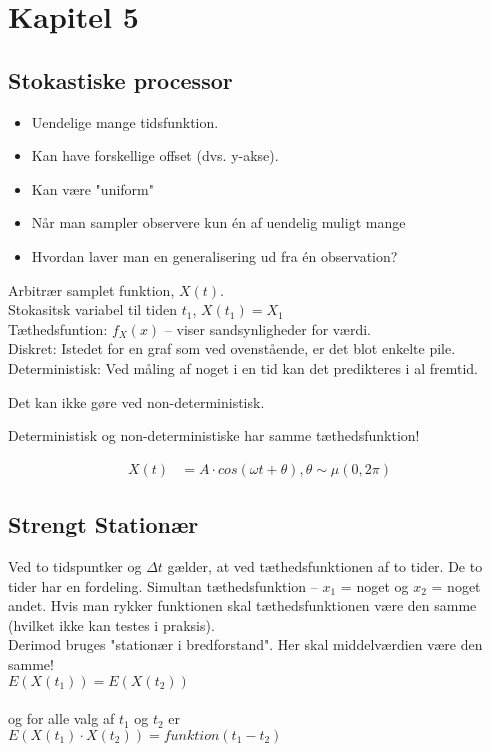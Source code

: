 \documentclass[Main]{subfiles}
\begin{document}
\chapter{Kapitel 5} %

\section{Stokastiske processor} %
\label{sec:stokastiske_processor}


\begin{itemize}
\item Uendelige mange tidsfunktion.
\item Kan have forskellige offset (dvs. y-akse).
\item Kan være "uniform" 
\item Når man sampler observere kun én af uendelig muligt mange
\item Hvordan laver man en generalisering ud fra én observation?
\end{itemize}

Arbitrær samplet funktion, $X(t)$.
\\
Stokasitsk variabel til tiden $t_1$, $X(t_1) = X_1$
\\
Tæthedsfuntion: $f_X(x)$ -- viser sandsynligheder for værdi.
\\
Diskret: Istedet for en graf som ved ovenstående, er det blot enkelte pile.
\\
Deterministisk: Ved måling af noget i en tid kan det predikteres i al fremtid.

Det kan ikke gøre ved non-deterministisk.

Deterministisk og non-deterministiske har samme tæthedsfunktion!

\begin{align*}
X(t) &= A\cdot cos( \omega t+\theta), \theta \sim \mu(0, 2\pi)
\end{align*}


\section{Strengt Stationær} %

Ved to tidspuntker og $\Delta t$ gælder, at ved tæthedsfunktionen af to tider.
De to tider har en fordeling.
Simultan tæthedsfunktion -- $x_1$ = noget og $x_2$ = noget andet.
Hvis man rykker funktionen skal tæthedsfunktionen være den samme (hvilket ikke kan testes i praksis).
\\
Derimod bruges "stationær i bredforstand".
Her skal middelværdien være den samme! 
\\
$E(X(t_1)) = E(X(t_2))$ 
\\\\
og for alle valg af $t_1$ og $t_2$ er 
\\
$ E(X(t_1) \cdot X(t_2)) = funktion(t_1-t_2)$
\end{document}
